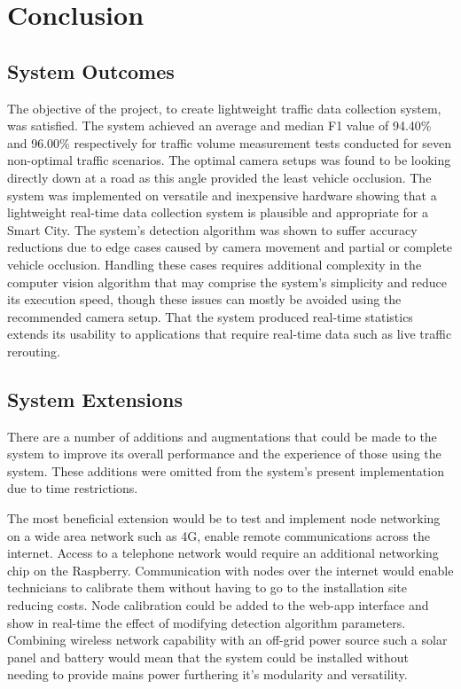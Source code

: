 \chapter{Conclusion}

\section{System Outcomes}

The objective of the project, to create lightweight traffic data collection system, was satisfied. The system achieved an average and median F1 value of 94.40\% and 96.00\% respectively for traffic volume measurement tests conducted for seven non-optimal traffic scenarios. The optimal camera setups was found to be looking directly down at a road as this angle provided the least vehicle occlusion. The system was implemented on versatile and inexpensive hardware showing that a lightweight real-time data collection system is plausible and appropriate for a Smart City. The system's detection algorithm was shown to suffer accuracy reductions due to edge cases caused by camera movement and partial or complete vehicle occlusion. Handling these cases requires additional complexity in the computer vision algorithm that may comprise the system's simplicity and reduce its execution speed, though these issues can mostly be avoided using the recommended camera setup. That the system produced real-time statistics extends its usability to applications that require real-time data such as live traffic rerouting. 

\section{System Extensions}

There are a number of additions and augmentations that could be made to the system to improve its overall performance and the experience of those using the system. These additions were omitted from the system's present implementation due to time restrictions. 

The most beneficial extension would be to test and implement node networking on a wide area network such as 4G, enable remote communications across the internet. Access to a telephone network would require an additional networking chip on the Raspberry. Communication with nodes over the internet would enable technicians to calibrate them without having to go to the installation site reducing costs. Node calibration could be added to the web-app interface and show in real-time the effect of modifying detection algorithm parameters. Combining wireless network capability with an off-grid power source such a solar panel and battery would mean that the system could be installed without needing to provide mains power furthering it's modularity and versatility.


